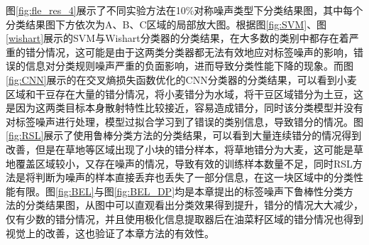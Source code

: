 图\ref{fig:fle_res_4}展示了不同实验方法在10\%对称噪声类型下分类结果图，其中每个分类结果图下方依次为A、B、C区域的局部放大图。根据图\ref{fig:SVM}、图\ref{wishart}展示的SVM与Wishart分类器的分类结果，在大多数的类别中都存在着严重的错分情况，这可能是由于这两类分类器都无法有效地应对标签噪声的影响，错误的信息对分类规则噪声严重的负面影响，进而导致分类性能下降的现象。而图\ref{fig:CNN}展示的在交叉熵损失函数优化的CNN分类器的分类结果，可以看到小麦区域和干豆存在大量的错分情况，将小麦错分为水域，将干豆区域错分为土豆，这是因为这两类目标本身散射特性比较接近，容易造成错分，同时该分类模型并没有对标签噪声进行处理，模型过拟合学习到了错误的类别信息，导致错分的情况。图\ref{fig:RSL}展示了使用鲁棒分类方法的分类结果，可以看到大量连续错分的情况得到改善，但是在草地等区域出现了小块的错分样本，将草地错分为大麦，这可能是草地覆盖区域较小，又存在噪声的情况，导致有效的训练样本数量不足，同时RSL方法是将判断为噪声的样本直接丢弃也丢失了一部分信息，在这一块区域中的分类性能有限。图\ref{fig:BEL}与图\ref{fig:BEL_DP}均是本章提出的标签噪声下鲁棒性分类方法的分类结果图，从图中可以直观看出分类效果得到提升，错分的情况大大减少，仅有少数的错分情况，并且使用极化信息提取器后在油菜籽区域的错分情况也得到视觉上的改善，这也验证了本章方法的有效性。

